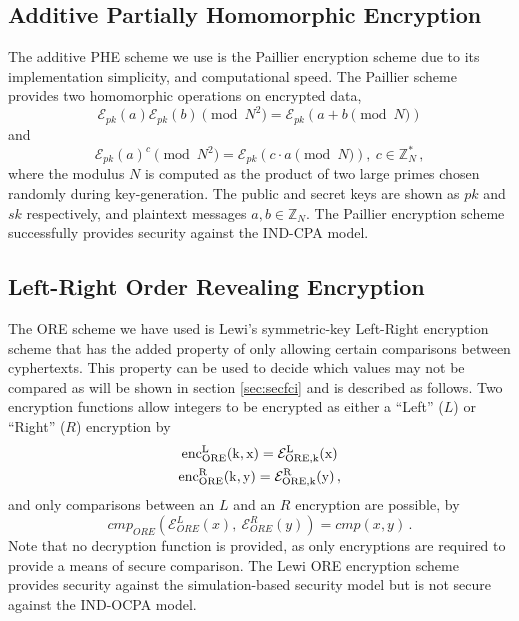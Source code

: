 \documentclass[letterpaper, 10 pt, conference]{ieeeconf}  %
\begin{document}
\subsection{Additive Partially Homomorphic Encryption} \label{subsec:paillier}
The additive PHE scheme we use is the Paillier encryption scheme \cite{paillierPublicKeyCryptosystemsBased1999} due to its implementation simplicity, and computational speed. The Paillier scheme provides two homomorphic operations on encrypted data, 
\begin{equation}
   \mathcal{E}_{pk}(a)\mathcal{E}_{pk}(b) \!\!\pmod{N^{2}} = \mathcal{E}_{pk}(a + b \!\!\pmod{N}) \label{eqn:paillier_add}
\end{equation}
and
\begin{equation}
   \mathcal{E}_{pk}(a)^c \!\!\pmod{N^{2}} = \mathcal{E}_{pk}(c\cdot a \!\!\pmod{N}),\ c \in \mathbb{Z}^*_N\,, \label{eqn:paillier_mult}
\end{equation}
where the modulus $N$ is computed as the product of two large primes chosen randomly during key-generation. The public and secret keys are shown as $pk$ and $sk$ respectively, and plaintext messages $a,b \in \mathbb{Z}_N$. The Paillier encryption scheme successfully provides security against the IND-CPA model.

\subsection{Left-Right Order Revealing Encryption} \label{subsec:lewi}
The ORE scheme we have used is Lewi's symmetric-key Left-Right encryption scheme \cite{lewiOrderRevealingEncryptionNew2016} that has the added property of only allowing certain comparisons between cyphertexts. This property can be used to decide which values may not be compared as will be shown in section \ref{sec:secfci} and is described as follows. Two encryption functions allow integers to be encrypted as either a ``Left'' ($L$) or ``Right'' ($R$) encryption by
\begin{equation}
   \begin{gathered} \label{eqn:lewi_l_r}
      \operatorfont{enc}^L_{ORE}(k, x) = \mathcal{E}^L_{ORE,k}(x) \\
      \operatorfont{enc}^R_{ORE}(k, y) = \mathcal{E}^R_{ORE,k}(y)\,,
   \end{gathered}
\end{equation}
and only comparisons between an $L$ and an $R$ encryption are possible, by
\begin{equation}
   cmp_{ORE}(\mathcal{E}^L_{ORE}(x),\ \mathcal{E}^R_{ORE}(y)) = cmp(x, y)\,. \label{eqn:lewi_cmp}
\end{equation}
Note that no decryption function is provided, as only encryptions are required to provide a means of secure comparison. The Lewi ORE encryption scheme provides security against the simulation-based security model \cite{chenettePracticalOrderRevealingEncryption2016} but is not secure against the IND-OCPA model.
\end{document}
